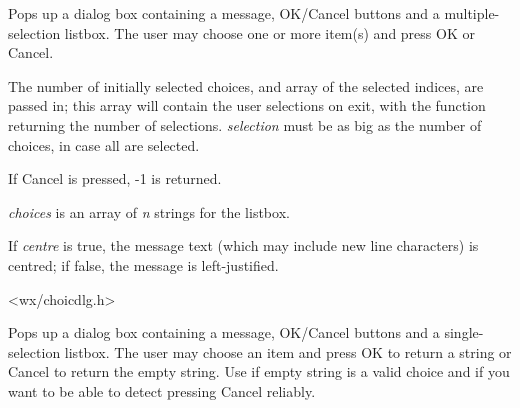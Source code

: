 Pops up a dialog box containing a message, OK/Cancel buttons and a multiple-selection
listbox. The user may choose one or more item(s) and press OK or Cancel.

The number of initially selected choices, and array of the selected indices,
are passed in; this array will contain the user selections on exit, with
the function returning the number of selections. {\it selection} must be
as big as the number of choices, in case all are selected.

If Cancel is pressed, -1 is returned.

{\it choices} is an array of {\it n} strings for the listbox.

If {\it centre} is true, the message text (which may include new line characters)
is centred; if false, the message is left-justified.


<wx/choicdlg.h>


\label{wxgetsinglechoice}



Pops up a dialog box containing a message, OK/Cancel buttons and a
single-selection listbox. The user may choose an item and press OK to return a
string or Cancel to return the empty string. Use
 if empty string is a
valid choice and if you want to be able to detect pressing Cancel reliably.

